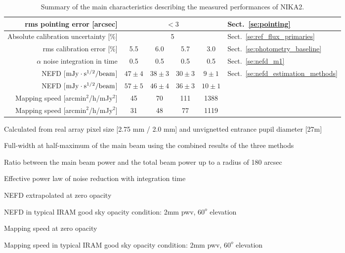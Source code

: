 \begin{table}[h]
\begin{center}
\begin{threeparttable}
\begin{tabular}{|r|c|c|c|c|l|}
      \hline
      rms pointing error    [arcsec]             & \multicolumn{4}{|c|}{$<3$} &  Sect.~\ref{se:pointing} \\
      \hline
      Absolute calibration uncertainty [\%]      &  \multicolumn{4}{|c|}{5}   & Sect.~\ref{se:ref_flux_primaries} \\
      \hline
      rms calibration error [\%]                 &    5.5       &     6.0       &      5.7       &     3.0       & Sect.~\ref{se:photometry_baseline} \\
      \hline
      $\alpha$ noise integration in time\tnote{(d)}\hspace{1mm}  & 0.5  & 0.5  &  0.5 & 0.5 & Sect.~\ref{se:nefd_m1} \\
      \hline
      NEFD\tnote{(e)}\hspace{1mm} [$\rm{mJy} \cdot \rm{s}^{1/2}/\rm{beam}$]  & $47 \pm 4$ & $38 \pm 3$  & $30 \pm 3$  & $9 \pm 1$ & Sect.~\ref{se:nefd_estimation_methods}\\
      NEFD\tnote{(f)}\hspace{1mm} [$\rm{mJy} \cdot \rm{s}^{1/2}/\rm{beam}$]  & $57 \pm 5$ & $46 \pm 4$  & $36 \pm 3$  & $10 \pm 1$ & \\
      Mapping speed\tnote{(g)}\hspace{1mm} [arcmin$^2$/h/mJy$^2$] & 45  & 70  & 111  &  1388 &  \\
      Mapping speed\tnote{(h)}\hspace{1mm} [arcmin$^2$/h/mJy$^2$] & 31  & 48  &  77  &  1119 &  \\
\hline

\end{tabular}
  \begin{tablenotes}
{\small     
  \item[(a)] Calculated from real array pixel size [2.75 mm / 2.0 mm] and unvignetted entrance pupil diameter [27m]
  \item[(b)] Full-width at half-maximum of the main beam using the combined results of the three methods
  \item[(c)] Ratio between the main beam power and the total beam power up to a radius of 180 arcsec
  \item[(d)] Effective power law of noise reduction with integration time
  \item[(e)] NEFD extrapolated at zero opacity
  \item[(f)] NEFD in typical IRAM good sky opacity condition: 2mm pwv, $60^o$ elevation
  \item[(g)] Mapping speed at zero opacity
  \item[(h)] Mapping speed in typical IRAM good sky opacity condition: 2mm pwv, $60^o$ elevation
}
  \end{tablenotes}
\end{threeparttable}
\caption[Main performance measurements]{Summary of the main characteristics describing the measured 
performances of NIKA2.}
\label{tab:nika2summary}
\end{center}  
\end{table}


